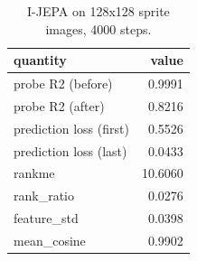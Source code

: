 \begin{table}[t]
\centering
\begin{tabular}{lr}
\toprule
quantity & value \\
\midrule
probe R2 (before) & 0.9991 \\
probe R2 (after) & 0.8216 \\
prediction loss (first) & 0.5526 \\
prediction loss (last) & 0.0433 \\
rankme & 10.6060 \\
rank\_ratio & 0.0276 \\
feature\_std & 0.0398 \\
mean\_cosine & 0.9902 \\
\bottomrule
\end{tabular}
\caption{I-JEPA on 128x128 sprite images, 4000 steps.}
\label{tab:ijepa}
\end{table}
